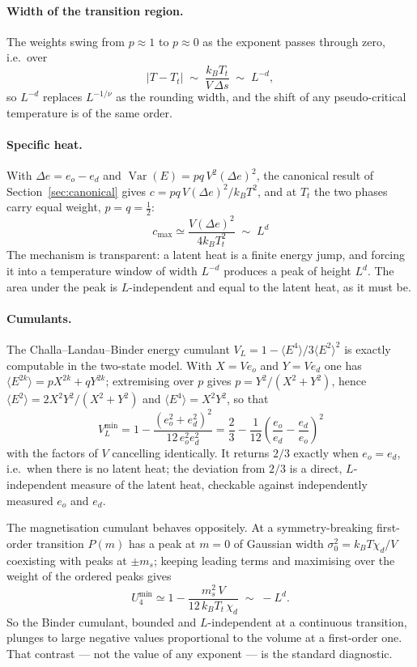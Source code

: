 \documentclass[10pt,a4paper]{article}
\theoremstyle{remark}
\newcommand{\Var}{\operatorname{Var}}
\begin{document}
\paragraph{Width of the transition region.} The weights swing from $p\approx1$ to
$p\approx0$ as the exponent passes through zero, i.e.\ over
\[
|T-T_t|\;\sim\;\frac{k_BT_t}{V\,\Delta s}\;\sim\;L^{-d} ,
\]
so $L^{-d}$ replaces $L^{-1/\nu}$ as the rounding width, and the shift of any
pseudo-critical temperature is of the same order.

\paragraph{Specific heat.} With $\Delta e=e_o-e_d$ and
$\Var(E)=pq\,V^{2}(\Delta e)^{2}$, the canonical result of
Section~\ref{sec:canonical} gives $c=pq\,V(\Delta e)^{2}/k_BT^{2}$, and at $T_t$
the two phases carry equal weight, $p=q=\tfrac12$:
\[
\;c_{\max}\simeq\frac{V(\Delta e)^{2}}{4k_BT_t^{2}}\;\sim\;L^{d}\
\]
The mechanism is transparent: a latent heat is a finite energy jump, and forcing
it into a temperature window of width $L^{-d}$ produces a peak of height $L^{d}$.
The area under the peak is $L$-independent and equal to the latent heat, as it
must be.

\paragraph{Cumulants.} The Challa--Landau--Binder energy cumulant
$V_L=1-\langle E^{4}\rangle/3\langle E^{2}\rangle^{2}$ is exactly computable in
the two-state model. With $X=Ve_o$ and $Y=Ve_d$ one has
$\langle E^{2k}\rangle=pX^{2k}+qY^{2k}$; extremising over $p$ gives
$p=Y^{2}/(X^{2}+Y^{2})$, hence $\langle E^{2}\rangle=2X^{2}Y^{2}/(X^{2}+Y^{2})$
and $\langle E^{4}\rangle=X^{2}Y^{2}$, so that
\[
\;
V_L^{\min}=1-\frac{(e_o^{2}+e_d^{2})^{2}}{12\,e_o^{2}e_d^{2}}
=\frac{2}{3}-\frac{1}{12}\left(\frac{e_o}{e_d}-\frac{e_d}{e_o}\right)^{2}
\
\]
with the factors of $V$ cancelling identically. It returns $2/3$ exactly when
$e_o=e_d$, i.e.\ when there is no latent heat; the deviation from $2/3$ is a
direct, $L$-independent measure of the latent heat, checkable against
independently measured $e_o$ and $e_d$.

The magnetisation cumulant behaves oppositely. At a symmetry-breaking first-order
transition $P(m)$ has a peak at $m=0$ of Gaussian width
$\sigma_0^{2}=k_BT\chi_d/V$ coexisting with peaks at $\pm m_s$; keeping leading
terms and maximising over the weight of the ordered peaks gives
\[
U_4^{\min}\simeq1-\frac{m_s^{2}\,V}{12\,k_BT_t\,\chi_d}\;\sim\;-L^{d} .
\]
So the Binder cumulant, bounded and $L$-independent at a continuous transition,
plunges to large negative values proportional to the volume at a first-order one.
That contrast --- not the value of any exponent --- is the standard diagnostic.
\end{document}
